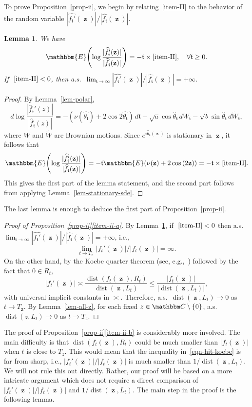 \documentclass[11pt]{article}
\theoremstyle{plain}
\newtheorem{lem}[thm]{Lemma}
\theoremstyle{definition}
\numberwithin{equation}{section}
\newcommand{\eqb}{\begin{equation}}
\newcommand{\eqe}{\end{equation}}
\newcommand{\eqbn}{\begin{equation*}}
\newcommand{\eqen}{\end{equation*}}
\newcommand{\BB}{\mathbbm}
\newcommand{\op}{\operatorname}
\newcommand{\rta}{\rightarrow}
\newcommand{\wt}{\widetilde}
\newcommand{\wh}{\widehat}
\newcommand{\dist}{{\operatorname{dist}}}
\newcommand{\zz}{{\op{\mathbf{z}}}}
\newcommand{\tz}{{\mathfrak t}}
\let\originalleft\left
\let\originalright\right
\renewcommand{\left}{\mathopen{}\mathclose\bgroup\originalleft}
\renewcommand{\right}{\aftergroup\egroup\originalright}
\begin{document}
To prove Proposition~\ref{prop-ii}, we begin by relating~\ref{item-II} to the behavior of the random variable $|\wh{f_{\tz}'}(\zz)|/|\wh{f_{\tz}}(\zz)|$.  

\begin{lem}
We have
\eqbn
\BB{E}\left( \log \frac{|\wh{f_{\tz}'}(\zz)|}{|\wh{f_{\tz}}(\zz)|} \right)  = - \tz \times \ref{item-II}  ,\quad\forall \tz \geq 0. 
\eqen
If $~\ref{item-II} < 0$, then a.s.\ $\lim_{\tz \rta \infty} |\wh{f_{\tz}'}(\zz)| / |\wh{f_{\tz}}(\zz)| = +\infty$.  
\label{lem-integral-ii}
\end{lem}


\begin{proof}
By Lemma~\ref{lem-polar},  
\eqb
d\log\frac{|\wh f_{\tz}' (z)|}{|\wh f_{\tz} (z)|} = -(\nu(\wh{\theta_\tz}) + 2 \cos{2 \wh{\theta_\tz}}) \, d\tz -  \sqrt{a}\cos{\wh\theta_\tz}\, dW_\tz - \sqrt{b}\sin{\wh\theta_\tz}\,  d\wt W_\tz ,
\label{eqn-sde-ratio}
\eqe
where $W$ and $\wt W$ are Brownian motions.
Since $e^{i\wh\theta_t(\zz)}$ is stationary in $\zz$, it follows that
\eqbn
\BB{E}\left( \log \frac{|\wh{f_{\tz}'}(\zz)|}{|\wh{f_{\tz}}(\zz)|} \right) = -\tz\BB{E}(\nu(\zz) + 2 \cos{(2 \zz)}) = - \tz \times \ref{item-II}  .
\eqen
This gives the first part of the lemma statement, and the second part follows from applying Lemma~\ref{lem-stationary-sde}.
\end{proof}

The last lemma is enough to deduce the first part of Proposition~\ref{prop-ii}.



\begin{proof}[Proof of Proposition~{\hyperref[item-ii-b]{\ref*{prop-ii}\ref*{item-ii-a}}}]
By Lemma~\ref{lem-integral-ii}, if $~\ref{item-II} < 0$ then a.s.\ $\lim_{\tz \rta \infty} |\wh{f_{\tz}'}(\zz)|/|\wh{f_{\tz}}(\zz)| = +\infty$, i.e., 
\[
\lim_{t\rta T_z^-} |f_t'(\zz)| / |f_t(\zz)| = \infty.
\]
On the other hand, by the Koebe quarter theorem (see, e.g.,~\cite[Corollary 3.18]{lawler-book}) followed by the fact that $0\in R_t$, 
\eqb \label{eqn-hit-koebe}
|f_t'(\zz)| \asymp \frac{\dist(f_t(\zz),R_t)}{\dist(\zz,L_t)} \leq \frac{|f_t(\zz)|}{|\dist(\zz,L_t)|} ,
\eqe
with universal implicit constants in $\asymp$. 
Therefore, a.s.\ $\dist(\zz,L_t) \rta 0$ as $t \rta T_{\zz}$. By Lemma~\ref{lem-all-z}, for each fixed $z\in\BB C\setminus \{0\}$, a.s.\ $\dist(z,L_t) \rta 0$ as $t \rta T_{z}$.
\end{proof}

The proof of Proposition~\hyperref[item-ii-b]{\ref*{prop-ii}\ref*{item-ii-b}} is considerably more involved.  
The main difficulty is that $\dist(f_t(\zz),R_t)$ could be much smaller than $ |f_t(\zz)|$ when $t$ is close to $T_z$. This would mean that the inequality in~\eqref{eqn-hit-koebe} is far from sharp, i.e., $|f_t'(\zz)| / |f_t(\zz)|$ is much smaller than $1/\op{dist}(\zz,L_t)$. We will not rule this out directly. Rather, our proof will be based on a more intricate argument which does not require a direct comparison of $|f_t'(\zz)| / |f_t(\zz)|$ and $1/\op{dist}(\zz,L_t)$.  
The main step in the proof is the following lemma. 
\end{document}
